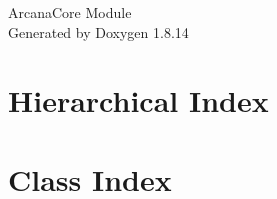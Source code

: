 \documentclass[twoside]{book}
\newcommand{\+}{\discretionary{\mbox{\scriptsize$\hookleftarrow$}}{}{}}
\newcommand{\clearemptydoublepage}{%
  \newpage{\pagestyle{empty}\cleardoublepage}%
}
\begin{document}
\hypersetup{pageanchor=false,
             bookmarksnumbered=true,
             pdfencoding=unicode
            }
\begin{titlepage}
\vspace*{7cm}
\begin{center}%
{\Large Arcana\+Core Module }\\
\vspace*{1cm}
{\large Generated by Doxygen 1.8.14}\\
\end{center}
\end{titlepage}
\clearemptydoublepage
{}
\tableofcontents
\clearemptydoublepage
{}
\hypersetup{pageanchor=true}

\chapter{Hierarchical Index}

\chapter{Class Index}

\end{document}

